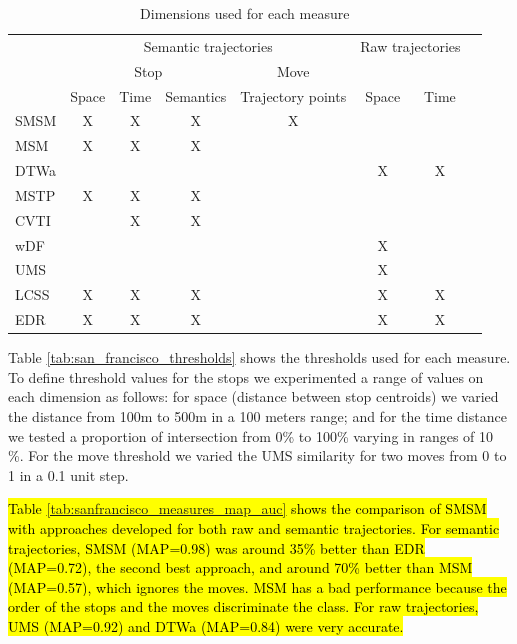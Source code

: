 \documentclass[12pt]{article}
\begin{document}
\begin{table}[!h]
\scriptsize
  \centering
  \begin{tabular}{|l|c|c|c|c|c|c|c|}
  	\hline
  & \multicolumn{4}{c|}{Semantic trajectories} & \multicolumn{2}{c|}{Raw trajectories} \\
 	\cline{2-5}
  & \multicolumn{3}{c|}{Stop} & \multicolumn{1}{c|}{Move} & \multicolumn{2}{c|}{} \\
 	\cline{2-7}
  & Space & Time & Semantics & Trajectory points & Space & Time\\
  	\hline
 SMSM & X & X & X & X & & \\
 MSM & X & X & X & & & \\
 DTWa &  &  &  & & X & X \\
 MSTP & X & X & X & & & \\
 CVTI & & X & X & & & \\
 wDF & & & & & X & \\
 UMS & & & & & X & \\
 LCSS & X & X & X & & X & X \\
 EDR & X & X & X & & X & X \\
    \hline
  \end{tabular}
  \caption{Dimensions used for each measure}
  \label{tab:san_francisco_measures}
\end{table}

Table \ref{tab:san_francisco_thresholds} shows the  thresholds used for each measure. To define threshold values for the stops we experimented  a range of values on each dimension as follows: for space (distance between stop centroids) we varied the distance from 100m to 500m in a 100 meters range; and for the time distance we tested a proportion of intersection from 0\% to 100\% varying in ranges of 10 \%. For the move threshold we varied the  UMS similarity for two moves from 0 to 1 in a 0.1 unit step.

\hl{Table {\ref{tab:sanfrancisco_measures_map_auc}} shows the comparison of SMSM with approaches developed for both raw and semantic trajectories.
For semantic trajectories, SMSM (MAP=0.98) was around 35\% better than EDR (MAP=0.72), the second best approach, and around 70\% better than MSM (MAP=0.57), which ignores the moves. MSM has a bad performance because the order of the stops and the moves discriminate the class. For raw trajectories, UMS (MAP=0.92) and DTWa (MAP=0.84) were  very accurate.}
\end{document}
